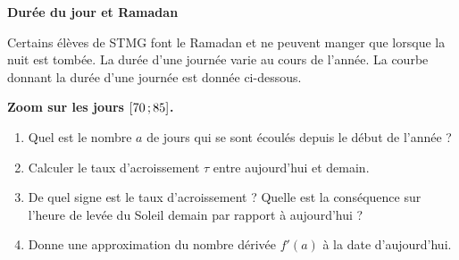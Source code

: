 \documentclass[10pt,a4paper,openany,twoside, eleve]{book}
\begin{document}
\newpage
\begin{exon}
 \textbf{Durée du jour et Ramadan}
  
 Certains élèves de STMG font le Ramadan et ne peuvent manger que lorsque la nuit est tombée. La durée d'une journée varie au cours de l'année. La courbe donnant la durée d'une journée est donnée ci-dessous.

 \begin{minipage}{.5\textwidth}
 \begin{center}
\end{center}
\end{minipage}
\begin{minipage}{.5\textwidth}
\begin{center}
  \textbf{
    Zoom sur les jours $\mathopen{[}70\mathclose{}\mathpunct{};85\mathclose{]}$.
  }
\end{center}
\end{minipage}

\begin{enumerate}
  \item Quel est le nombre $a$ de jours qui se sont écoulés depuis le début de l'année ?
  \item Calculer le taux d'acroissement $\tau$ entre aujourd'hui et demain.
  \item De quel signe est le taux d'acroissement ? Quelle est la conséquence sur l'heure de levée du Soleil demain par rapport à aujourd'hui ?
  \item Donne une approximation du nombre dérivée $f'(a)$ à la date d'aujourd'hui.
\end{enumerate}

\vspace{4mm}
\noindent{}

\end{exon}
\end{document}
